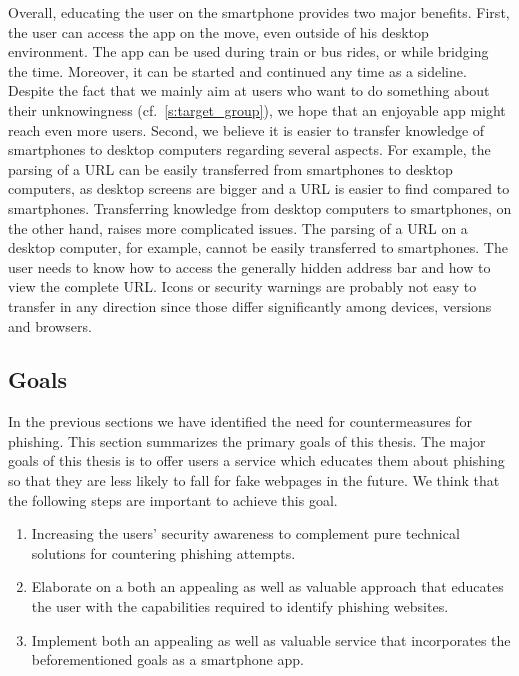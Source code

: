 Overall, educating the user on the smartphone provides two major benefits.
 First, the user can access the app on the move, even outside of his desktop environment.
 The app can be used during train or bus rides, or while bridging the time.
 Moreover, it can be started and continued any time as a sideline.
Despite the fact that we mainly aim at users who want to do something about their unknowingness (cf.~\autoref{s:target_group}), we hope that an enjoyable app might reach even more users.
 Second, we believe it is easier to transfer knowledge of smartphones to desktop computers regarding several aspects.
For example, the parsing of a URL can be easily transferred from smartphones to desktop computers, as desktop screens are bigger and a URL is easier to find compared to smartphones.
 Transferring knowledge from desktop computers to smartphones, on the other hand, raises more complicated issues.
The parsing of a URL on a desktop computer, for example, cannot be easily transferred to smartphones.
The user needs to know how to access the generally hidden address bar and how to view the complete URL.
Icons or security warnings are probably not easy to transfer in any direction since those differ significantly among devices, versions and browsers.

 
\subsection{Goals}
\label{s:goals}
In the previous sections we have identified the need for countermeasures for phishing.
This section summarizes the primary goals of this thesis.
The major goals of this thesis is to offer users a service which educates them about phishing so that they are less likely to fall for fake webpages in the future.
 We think that the following steps are important to achieve this goal.

\begin{enumerate}
	\item Increasing the users' security awareness to complement pure technical solutions for countering phishing attempts.
	\item Elaborate on a both an appealing as well as valuable approach that educates the user with the capabilities required to identify phishing websites.
	\item Implement both an appealing as well as valuable service that incorporates the beforementioned goals as a smartphone app.
\end{enumerate}

